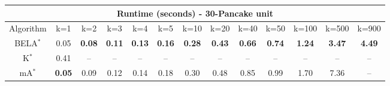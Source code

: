 \begin{tabular}{c|cccccccccccc}\toprule
\multicolumn{13}{c}{Runtime (seconds) - 30-Pancake unit}\\ \midrule
Algorithm & k=1 & k=2 & k=3 & k=4 & k=5 & k=10 & k=20 & k=40 & k=50 & k=100 & k=500 & k=900 \\ \midrule
BELA$^*$ & 0.05 & \textbf{0.08} & \textbf{0.11} & \textbf{0.13} & \textbf{0.16} & \textbf{0.28} & \textbf{0.43} & \textbf{0.66} & \textbf{0.74} & \textbf{1.24} & \textbf{3.47} & \textbf{4.49} \\
K$^*$ & 0.41 & -- & -- & -- & -- & -- & -- & -- & -- & -- & -- & -- \\
mA$^*$ & \textbf{0.05} & 0.09 & 0.12 & 0.14 & 0.18 & 0.30 & 0.48 & 0.85 & 0.99 & 1.70 & 7.36 & -- \\ \bottomrule 
\end{tabular}
